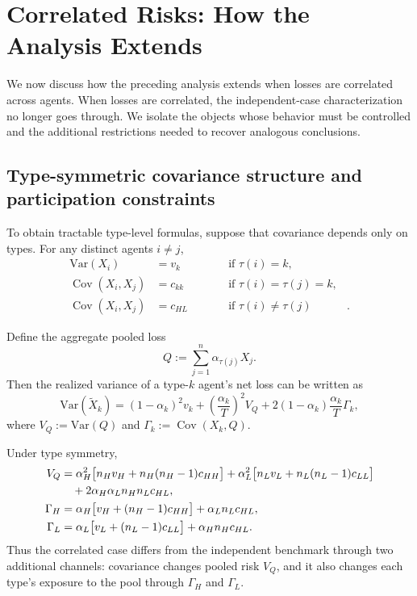 \documentclass[a4paper,12pt]{article}
\theoremstyle{definition}
\theoremstyle{remark}
\DeclareMathOperator{\Cov}{Cov}
\newcommand{\Var}{\mathrm{Var}}
\newcommand{\1}{\mathbf{1}}
\begin{document}
\section{Correlated Risks: How the Analysis Extends}
\label{sec:correlated}

We now discuss how the preceding analysis extends when losses are correlated
across agents. When losses are correlated, the independent-case characterization no longer goes through. We isolate the objects whose behavior must be controlled and the additional restrictions needed to recover analogous conclusions.

\subsection{Type-symmetric covariance structure and participation constraints}

To obtain tractable type-level formulas, suppose that covariance depends only on
types. For any distinct agents \(i\neq j\),
\begin{align*}
\Var(X_i)&=v_k
&&\text{if }\tau(i)=k,\\
\Cov(X_i,X_j)&=c_{kk}
\qquad&&\text{if }\tau(i)=\tau(j)=k,\\
\Cov(X_i,X_j)&=c_{HL}
\qquad&&\text{if }\tau(i)\neq\tau(j)&.
\end{align*}

Define the aggregate pooled loss
\[
Q:=\sum_{j=1}^n \alpha_{\tau(j)}X_j.
\]
Then the realized variance of a type-\(k\) agent's net loss can be written as
\[
\Var(\tilde X_k)
=
(1-\alpha_k)^2v_k
+
\left(\frac{\alpha_k}{T}\right)^2V_Q
+
2(1-\alpha_k)\frac{\alpha_k}{T}\Gamma_k,
\]
where
$V_Q:=\Var(Q)$ and $\Gamma_k:=\Cov(X_k,Q)$.

Under type symmetry,
\begin{align*}
V_Q
&=
\alpha_H^2\bigl[n_Hv_H+n_H(n_H-1)c_{HH}\bigr]
+
\alpha_L^2\bigl[n_Lv_L+n_L(n_L-1)c_{LL}\bigr]
\notag\\
&\quad
+
2\alpha_H\alpha_Ln_Hn_Lc_{HL},
\label{eq:VQ-corr-new}
\\
\Gamma_H
&=
\alpha_H\bigl[v_H+(n_H-1)c_{HH}\bigr]+\alpha_Ln_Lc_{HL},
\\
\Gamma_L
&=
\alpha_L\bigl[v_L+(n_L-1)c_{LL}\bigr]+\alpha_Hn_Hc_{HL}.
\end{align*}
Thus the correlated case differs from the independent benchmark through two
additional channels: covariance changes pooled risk \(V_Q\), and it also
changes each type's exposure to the pool through \(\Gamma_H\) and \(\Gamma_L\).
\end{document}
